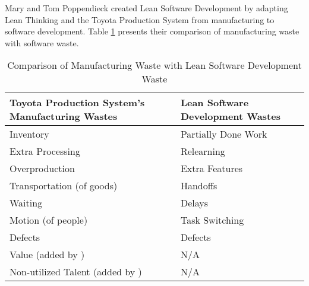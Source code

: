 Mary and Tom Poppendieck created Lean Software Development \cite{PoppendieckLeanSoftwareDevelopment} by adapting Lean Thinking and the Toyota Production System from manufacturing to software development. Table \ref{ManufacturingVersusLeanSoftwareWaste} presents their comparison of manufacturing waste with software waste.

\begin{table}[t]
\renewcommand{\arraystretch}{1.5}
\centering
\caption{Comparison of Manufacturing Waste with Lean Software Development Waste}
\label{ManufacturingVersusLeanSoftwareWaste}
\begin{tabular}{|l|l|} %
\hline
Toyota Production System's Manufacturing Wastes & Lean Software Development Wastes \cite{PoppendieckConceptToCash} \\ \hline
Inventory                                       & Partially Done Work                       \\ \hline
Extra Processing                                & Relearning                                \\ \hline
Overproduction                                  & Extra Features                            \\ \hline
Transportation (of goods)                       & Handoffs                                  \\ \hline
Waiting                                         & Delays                                    \\ \hline
Motion (of people)                              & Task Switching                            \\ \hline
Defects                                         & Defects                                   \\ \hline
Value (added by \cite{WomackLeanThinking})                 & N/A                                       \\ \hline
Non-utilized Talent (added by \cite{ LikerToyotaWay})     & N/A                                       \\ \hline
\end{tabular}
\end{table}

